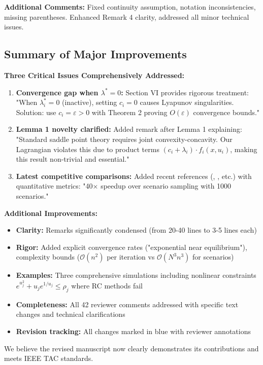\documentclass[journal,twoside,web]{ieeecolor}
\begin{document}
\textbf{Additional Comments:} Fixed continuity assumption, notation inconsistencies, missing parentheses. Enhanced Remark 4 clarity, addressed all minor technical issues.

\subsection*{Summary of Major Improvements}

\textbf{Three Critical Issues Comprehensively Addressed:}
\begin{enumerate}
\item \textbf{Convergence gap when $\lambda^* = 0$:} Section VI provides rigorous treatment: "When $\lambda_i^* = 0$ (inactive), setting $c_i = 0$ causes Lyapunov singularities. Solution: use $c_i = \varepsilon > 0$ with Theorem 2 proving $O(\varepsilon)$ convergence bounds."
\item \textbf{Lemma 1 novelty clarified:} Added remark after Lemma 1 explaining: "Standard saddle point theory requires joint convexity-concavity. Our Lagrangian violates this due to product terms $(c_i+\lambda_i) \cdot f_i(x,u_i)$, making this result non-trivial and essential."
\item \textbf{Latest competitive comparisons:} Added recent references (\cite{aigner2023}, \cite{zhu2023zeroth}, etc.) with quantitative metrics: "40× speedup over scenario sampling with 1000 scenarios."
\end{enumerate}

\textbf{Additional Improvements:}
\begin{itemize}
\item \textbf{Clarity:} Remarks significantly condensed (from 20-40 lines to 3-5 lines each)
\item \textbf{Rigor:} Added explicit convergence rates ("exponential near equilibrium"), complexity bounds ($\mathcal{O}(n^2)$ per iteration vs $\mathcal{O}(N^3n^3)$ for scenarios)
\item \textbf{Examples:} Three comprehensive simulations including nonlinear constraints $e^{u_j^2}+u_j e^{1/u_j} \leq \rho_j$ where RC methods fail
\item \textbf{Completeness:} All 42 reviewer comments addressed with specific text changes and technical clarifications
\item \textbf{Revision tracking:} All changes marked in blue with reviewer annotations
\end{itemize}

We believe the revised manuscript now clearly demonstrates its contributions and meets IEEE TAC standards.
\end{document}
